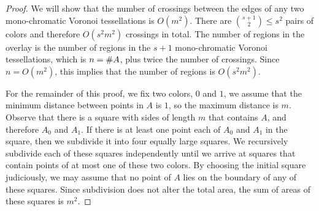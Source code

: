\documentclass[10pt,a4paper]{amsart}
\newcommand{\card}[1]       {\mm{{\#}{#1}}}
\newcommand {\mm}[1]   {\ifmmode{#1}\else{\mbox{\(#1\)}}\fi}
\begin{document}
\begin{proof}
  We will show that the number of crossings between the edges of any two mono-chromatic Voronoi tessellations is $O(m^2)$.
  There are $\binom{s+1}{2} \leq s^2$ pairs of colors and therefore $O(s^2 m^2)$ crossings in total.
  The number of regions in the overlay is the number of regions in the $s+1$ mono-chromatic Voronoi tessellations, which is $n = \card{A}$, plus twice the number of crossings.
  Since $n = O(m^2)$, this implies that the number of regions is $O(s^2 m^2)$.
  
  \medskip
  For the remainder of this proof, we fix two colors, $0$ and $1$, we assume that the minimum distance between points in $A$ is $1$, so the maximum distance is $m$.
  Observe that there is a square with sides of length $m$ that contains $A$, and therefore $A_0$ and $A_1$.
  If there is at least one point each of $A_0$ and $A_1$ in the square, then we subdivide it into four equally large squares.
  We recursively subdivide each of these squares independently until we arrive at squares that contain points of at most one of these two colors.
  By choosing the initial square judiciously, we may assume that no point of $A$ lies on the boundary of any of these squares.
  Since subdivision does not alter the total area, the sum of areas of these squares is $m^2$.
  

\end{proof}
\end{document}
